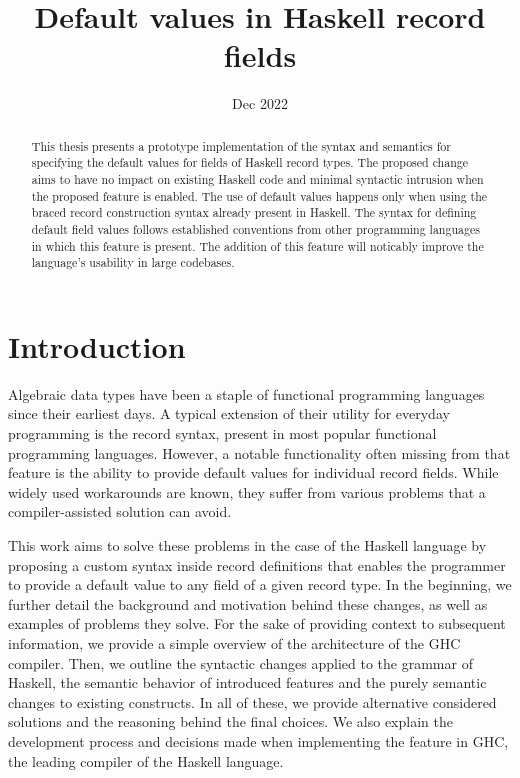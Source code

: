 \documentclass[en]{pracamgr}
\title{Default values in Haskell record fields}
\date{Dec 2022}
\begin{document}
\maketitle

\begin{abstract}
This thesis presents a prototype implementation of the syntax and semantics for specifying
the default values for fields of Haskell record types. The proposed change aims to have no 
impact on existing Haskell code and minimal syntactic intrusion when the proposed feature 
is enabled. The use of default values happens only when using the braced record construction syntax 
already present in Haskell. The syntax for defining default field values follows established
conventions from other programming languages in which this feature is present. The addition
of this feature will noticably improve the language's usability in large codebases.
\end{abstract}

\tableofcontents

\chapter*{Introduction}

Algebraic data types have been a staple of functional programming languages since their earliest days.
A typical extension of their utility for everyday programming is the record syntax, present in most popular functional programming languages.
However, a notable functionality often missing from that feature is the ability to provide default values for individual record fields.
While widely used workarounds are known, they suffer from various problems that a compiler-assisted solution can avoid.

This work aims to solve these problems in the case of the Haskell language \cite{HudakHaskell}
by proposing a custom syntax inside record definitions that enables the programmer to provide a default value to any field of a given record type.
In the beginning, we further detail the background and motivation behind these changes, as well as examples of problems they solve.
For the sake of providing context to subsequent information, we provide a simple overview of the architecture of the GHC compiler.
Then, we outline the syntactic changes applied to the grammar of Haskell, 
the semantic behavior of introduced features and the purely semantic changes to existing constructs.
In all of these, we provide alternative considered solutions and the reasoning behind the final choices.
We also explain the development process and decisions made when implementing the feature in GHC, the leading compiler of the Haskell language.
\end{document}
